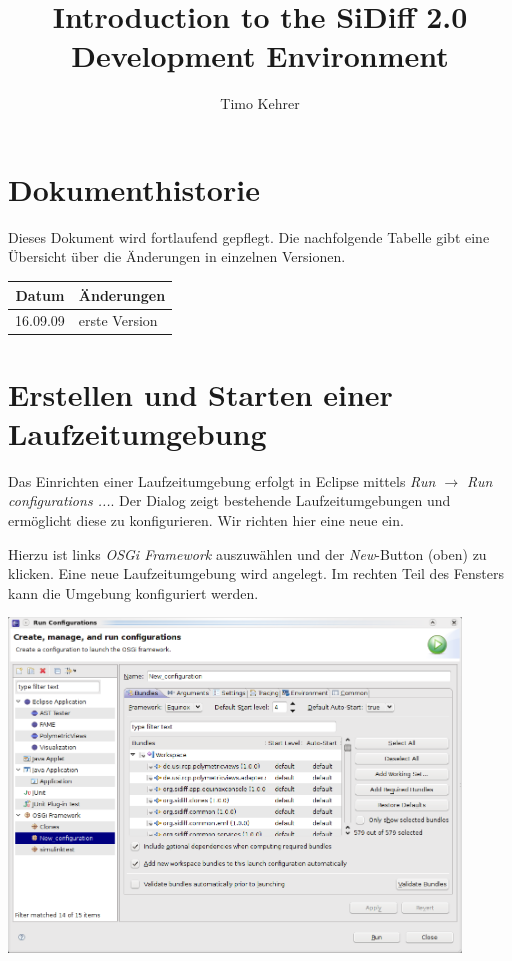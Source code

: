 \documentclass[10pt,a4paper]{scrartcl}
\title{Introduction to the SiDiff 2.0 Development Environment}
\author{Timo Kehrer}
\begin{document}
\maketitle
\tableofcontents
\newpage
\section*{Dokumenthistorie}
Dieses Dokument wird fortlaufend gepflegt. Die nachfolgende Tabelle gibt 
eine Übersicht über die Änderungen in einzelnen Versionen.

\begin{tabular}{|c|p{11cm}|}\hline
Datum & Änderungen \\\hline\hline
16.09.09 & erste Version \\\hline
\end{tabular} 


\newpage

\section{Erstellen und Starten einer Laufzeitumgebung}
Das Einrichten einer Laufzeitumgebung erfolgt in Eclipse
mittels \emph{Run $\to$ Run configurations ...}. Der Dialog zeigt bestehende 
Laufzeitumgebungen und ermöglicht diese zu konfigurieren. Wir richten hier eine 
neue ein.

Hierzu ist links \emph{OSGi Framework} auszuwählen und der \emph{New}-Button (oben)
zu klicken. Eine neue Laufzeitumgebung wird angelegt. Im rechten Teil des Fensters
kann die Umgebung konfiguriert werden.

\begin{center}
\includegraphics[width=12cm]{pics/runconfig1.png}
\end{center}
\end{document}
